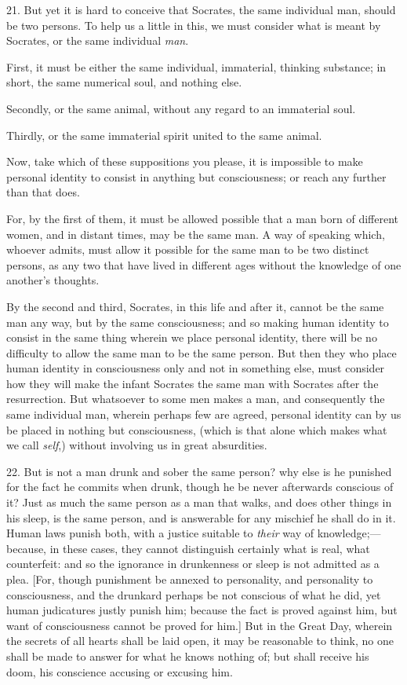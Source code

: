 21. But yet it is hard to conceive that Socrates, the same individual
man, should be two persons. To help us a little in this, we must
consider what is meant by Socrates, or the same individual
\textit{man}.

First, it must be either the same individual, immaterial, thinking
substance; in short, the same numerical soul, and nothing else.

Secondly, or the same animal, without any regard to an immaterial
soul.

Thirdly, or the same immaterial spirit united to the same animal.

Now, take which of these suppositions you please, it is impossible to
make personal identity to consist in anything but consciousness; or
reach any further than that does.

For, by the first of them, it must be allowed possible that a man born
of different women, and in distant times, may be the same man. A way
of speaking which, whoever admits, must allow it possible for the same
man to be two distinct persons, as any two that have lived in
different ages without the knowledge of one another's thoughts.

By the second and third, Socrates, in this life and after it, cannot
be the same man any way, but by the same consciousness; and so making
human identity to consist in the same  thing wherein we
place personal identity, there will be no difficulty to allow the same
man to be the same person. But then they who place human identity in
consciousness only and not in something else, must consider how they
will make the infant Socrates the same man with Socrates after the
resurrection. But whatsoever to some men makes a man, and consequently
the same individual man, wherein perhaps few are agreed, personal
identity can by us be placed in nothing but consciousness, (which is
that alone which makes what we call \textit{self},) without involving
us in great absurdities.


22. But is not a man drunk and sober the same person? why else is he
punished for the fact he commits when  drunk, though he be
never afterwards conscious of it? Just as much the same person as a
man that walks, and does other things in his sleep, is the same
person, and is answerable for any mischief he shall do in it. Human
laws punish both, with a justice suitable to \textit{their} way of
knowledge;---because, in these cases, they cannot distinguish
certainly what is real, what counterfeit: and so the ignorance in
drunkenness or sleep is not admitted as a plea. [For, though
punishment be annexed to personality, and personality to
consciousness, and the drunkard perhaps be not conscious of what he
did, yet human judicatures justly punish him; because the fact is
proved against him, but want of consciousness cannot be proved for
him.] But in the Great Day, wherein the secrets of all hearts shall be
laid open, it may be reasonable  to think, no one shall be
made to answer for what he knows nothing of; but shall receive his
doom, his conscience accusing or excusing him.

